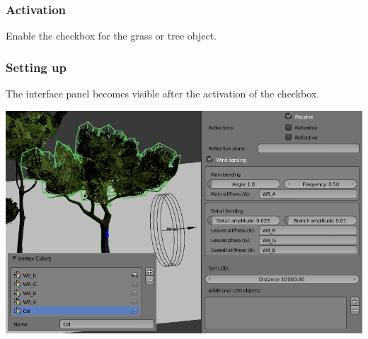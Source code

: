 \documentclass[a4paper,12pt,oneside]{sphinxmanual}
\begin{document}
\subsubsection{Activation}
\label{outdoor_rendering:id34}
Enable the  checkbox for the grass or tree object.


\subsubsection{Setting up}
\label{outdoor_rendering:id35}
The interface panel becomes visible after the activation of the  checkbox.

{\hfill\includegraphics[width=1.000\linewidth]{wind_bending_setup.jpg}\hfill}
\end{document}
